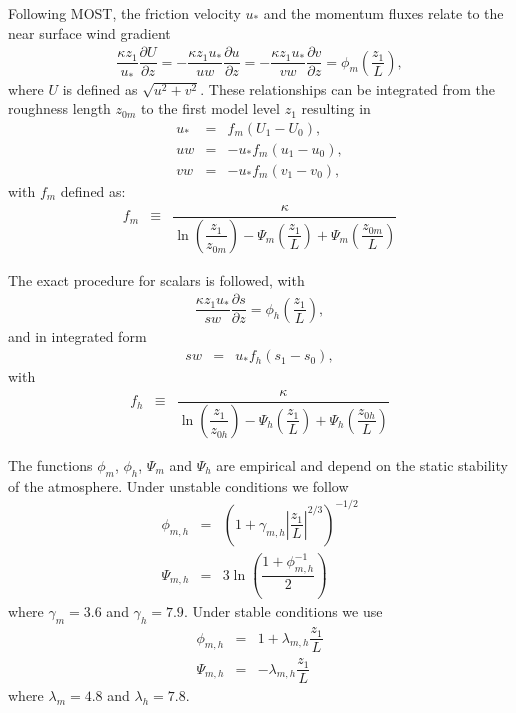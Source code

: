 \documentclass[gmd]{copernicus}
\begin{document}
Following MOST, the friction velocity $u_*$ and the momentum fluxes relate to the near surface wind gradient
\begin{eqnarray}
\dfrac{\kappa z_1}{u_*} \dfrac{\partial U}{\partial z}  = 
- \dfrac{\kappa z_1 u_*}{u w} \dfrac{\partial u}{\partial z} =
- \dfrac{\kappa z_1 u_*}{v w} \dfrac{\partial v}{\partial z} =
\phi_m \left( \dfrac{z_1}{L} \right),
\end{eqnarray}
where $U$ is defined as $\sqrt{u^2 + v^2}$. These relationships can be integrated from the roughness length $z_{0m}$ to the first model level $z_1$ resulting in 
\begin{eqnarray}
u_* & =  & f_m \left( U_1 - U_0 \right),\\
uw & = & - u_* f_m \left( u_1 - u_0 \right),\\
vw & = & - u_* f_m \left( v_1 - v_0 \right),
\end{eqnarray}
with $f_m$ defined as:
\begin{eqnarray}
f_m & \equiv & \dfrac{\kappa}
{ \ln{\left( \dfrac{z_1}{z_{0m}} \right)}
	- \varPsi_m \left( \dfrac{z_1}{L} \right)
	+ \varPsi_m \left( \dfrac{z_{0m}}{L} \right) }
\end{eqnarray}

The exact procedure for scalars is followed, with
\begin{eqnarray}
\dfrac{\kappa z_1 u_*}{s w} \dfrac{\partial s}{\partial z} =
\phi_h \left( \dfrac{z_1}{L} \right),
\end{eqnarray}
and in integrated form
\begin{eqnarray}
sw & = & u_* f_h \left( s_1 - s_0 \right),
\end{eqnarray}
with
\begin{eqnarray}
f_h & \equiv &
\dfrac{\kappa}
{ \ln{\left( \dfrac{z_1}{z_{0h}} \right)}
	- \varPsi_h \left( \dfrac{z_1}{L} \right)
	+ \varPsi_h \left( \dfrac{z_{0h}}{L} \right) }
\end{eqnarray}

The functions $\phi_m$, $\phi_h$, $\varPsi_m$ and $\varPsi_h$ are empirical and depend on the static stability of the atmosphere. Under unstable conditions we follow \citet{Wilson2001, Wyngaard2010} 
\begin{eqnarray}
\phi_{m,h} & = & \left( 1 + \gamma_{m,h} \left| \dfrac{z_1}{L} \right|^{2/3} \right)^{-1/2}\\
\varPsi_{m,h} & = & 3 \ln{\left( \dfrac{1 + \phi_{m,h}^{-1}}{2} \right)} 
\end{eqnarray}
where $\gamma_m = 3.6$ and $\gamma_h = 7.9$. Under stable conditions we use \citet{Hogstrom1988, Wyngaard2010}
\begin{eqnarray}
\phi_{m,h} & = & 1 + \lambda_{m,h} \dfrac{z_1}{L}\\
\varPsi_{m,h} & = & - \lambda_{m,h} \dfrac{z_1}{L}
\end{eqnarray}
where $\lambda_m = 4.8$ and $\lambda_h = 7.8$.
\end{document}
